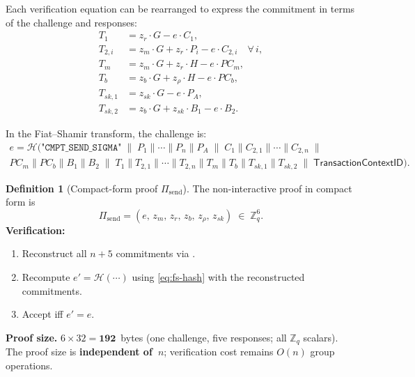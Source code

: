 \documentclass[11pt]{article}
\theoremstyle{definition}
\newtheorem{definition}[theorem]{Definition}
\newcommand{\Zq}{\mathbb{Z}_q}
\newcommand{\sk}{\mathit{sk}}
\newcommand{\TransCtx}{\textsf{TransactionContextID}}
\begin{document}
Each verification equation can be rearranged to express the commitment
in terms of the challenge and responses:
\begin{align}
  T_1 &= z_r \cdot G - e \cdot C_1,
    \label{eq:recon-t1} \\
  T_{2,i} &= z_m \cdot G + z_r \cdot P_i - e \cdot C_{2,i}
    \quad \forall\, i,
    \label{eq:recon-t2} \\
  T_m &= z_m \cdot G + z_r \cdot H - e \cdot \mathit{PC}_m,
    \label{eq:recon-tm} \\
  T_b &= z_b \cdot G + z_\rho \cdot H - e \cdot \mathit{PC}_b,
    \label{eq:recon-tb} \\
  T_{\sk,1} &= z_{\sk} \cdot G - e \cdot P_A,
    \label{eq:recon-tsk1} \\
  T_{\sk,2} &= z_b \cdot G + z_{\sk} \cdot B_1 - e \cdot B_2.
    \label{eq:recon-tsk2}
\end{align}

In the Fiat--Shamir transform, the challenge is:
\begin{multline}
  \label{eq:fs-hash}
  e = \mathcal{H}\!\bigl(
    \texttt{"CMPT\_SEND\_SIGMA"} \;\|\;
    P_1 \| \cdots \| P_n \| P_A \;\|\;
    C_1 \| C_{2,1} \| \cdots \| C_{2,n} \;\|\; \\
    \mathit{PC}_m \| \mathit{PC}_b \| B_1 \| B_2 \;\|\;
    T_1 \| T_{2,1} \| \cdots \| T_{2,n} \| T_m
    \| T_b \| T_{\sk,1} \| T_{\sk,2} \;\|\;
    \TransCtx
  \bigr).
\end{multline}

\begin{definition}[Compact-form proof $\Pi_{\mathrm{send}}$]
  \label{def:compact}
  The non-interactive proof in compact form is
  \[
    \Pi_{\mathrm{send}} = (e,\, z_m,\, z_r,\, z_b,\, z_\rho,\, z_{\sk})
    \;\in\; \Zq^6.
  \]
  \textbf{Verification:}
  \begin{enumerate}
    \item Reconstruct all $n + 5$ commitments
          via .
    \item Recompute $e' = \mathcal{H}(\cdots)$ using
          \cref{eq:fs-hash} with the reconstructed commitments.
    \item Accept iff $e' = e$.
  \end{enumerate}
\end{definition}

\noindent\textbf{Proof size.}
$6 \times 32 = \mathbf{192}$~bytes (one challenge, five responses;
all $\Zq$ scalars).
The proof size is \textbf{independent of~$n$};
verification cost remains $O(n)$ group operations.
\end{document}
